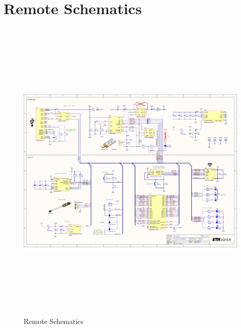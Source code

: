 \section{Remote Schematics}
\label{sec:Schematics}
\begin{figure}[H]
	\centering
	\includegraphics[height=15cm, angle=-90]{../../5_Hardware/WSBR_Board/Project Outputs for WSBR_Board/WSBR_Board.PDF}
	\caption{Remote Schematics}
	\label{fig:Remote Schematics}
\end{figure}
\newpage